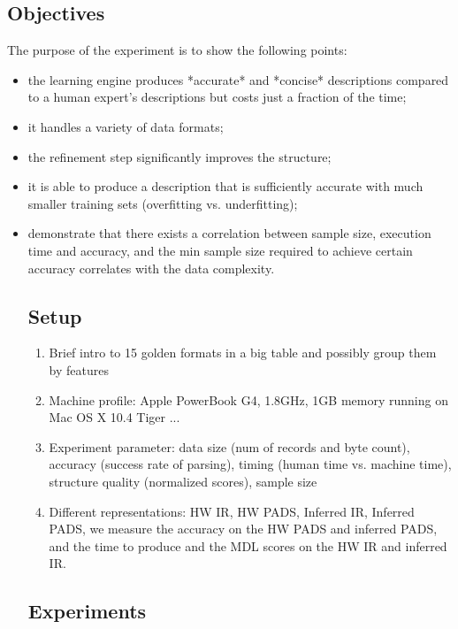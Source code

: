 \subsection{Objectives}

The purpose of the experiment is to show the following points:
\begin{itemize}
\item the learning engine produces *accurate* and *concise* descriptions compared to a human
expert's descriptions but costs just a fraction of the time; 
\item it handles a variety of data formats; 
\item the refinement step significantly improves the structure; 
\item it is able to produce a description that is sufficiently accurate with 
much smaller training sets (overfitting vs. underfitting); 
\item demonstrate that there exists a correlation between sample size, execution time and accuracy,
and the min sample size required to achieve certain accuracy correlates with the 
data complexity.

\subsection{Setup}

\begin{enumerate}
\item Brief intro to 15 golden formats in a big table and possibly group them by
features

\item Machine profile: Apple PowerBook G4, 1.8GHz, 1GB memory running on Mac OS X 10.4 Tiger ...

\item Experiment parameter: data size (num of records and byte count), accuracy (success rate of parsing), 
timing (human time vs. machine time), structure quality (normalized scores), sample size

\item Different representations: HW IR, HW PADS, Inferred IR, Inferred PADS, we measure
the accuracy on the HW PADS and inferred PADS, and the time to produce and the MDL scores on
the HW IR and inferred IR.
\end{enumerate}

\subsection{Experiments}


\end{itemize}
